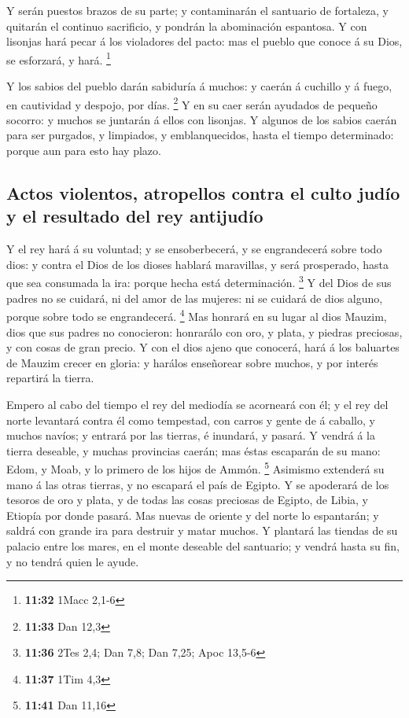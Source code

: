  Y serán puestos brazos de su parte; y contaminarán el
santuario de fortaleza, y quitarán el continuo sacrificio, y pondrán la
abominación espantosa.  Y con lisonjas hará pecar á los
violadores del pacto: mas el pueblo que conoce á su Dios, se esforzará,
y hará. \footnote{\textbf{11:32} 1Macc 2,1-6}

 Y los sabios del pueblo darán sabiduría á muchos: y
caerán á cuchillo y á fuego, en cautividad y despojo, por días.
\footnote{\textbf{11:33} Dan 12,3}  Y en su caer serán
ayudados de pequeño socorro: y muchos se juntarán á ellos con lisonjas.
 Y algunos de los sabios caerán para ser purgados, y
limpiados, y emblanquecidos, hasta el tiempo determinado: porque aun
para esto hay plazo.

\hypertarget{actos-violentos-atropellos-contra-el-culto-juduxedo-y-el-resultado-del-rey-antijuduxedo}{%
\subsection{Actos violentos, atropellos contra el culto judío y el
resultado del rey
antijudío}\label{actos-violentos-atropellos-contra-el-culto-juduxedo-y-el-resultado-del-rey-antijuduxedo}}

 Y el rey hará á su voluntad; y se ensoberbecerá, y se
engrandecerá sobre todo dios: y contra el Dios de los dioses hablará
maravillas, y será prosperado, hasta que sea consumada la ira: porque
hecha está determinación. \footnote{\textbf{11:36} 2Tes 2,4; Dan 7,8;
  Dan 7,25; Apoc 13,5-6}  Y del Dios de sus padres no se
cuidará, ni del amor de las mujeres: ni se cuidará de dios alguno,
porque sobre todo se engrandecerá. \footnote{\textbf{11:37} 1Tim 4,3}
 Mas honrará en su lugar al dios Mauzim, dios que sus
padres no conocieron: honrarálo con oro, y plata, y piedras preciosas, y
con cosas de gran precio.  Y con el dios ajeno que
conocerá, hará á los baluartes de Mauzim crecer en gloria: y harálos
enseñorear sobre muchos, y por interés repartirá la tierra.

 Empero al cabo del tiempo el rey del mediodía se
acorneará con él; y el rey del norte levantará contra él como tempestad,
con carros y gente de á caballo, y muchos navíos; y entrará por las
tierras, é inundará, y pasará.  Y vendrá á la tierra
deseable, y muchas provincias caerán; mas éstas escaparán de su mano:
Edom, y Moab, y lo primero de los hijos de Ammón. \footnote{\textbf{11:41}
  Dan 11,16}  Asimismo extenderá su mano á las otras
tierras, y no escapará el país de Egipto.  Y se apoderará
de los tesoros de oro y plata, y de todas las cosas preciosas de Egipto,
de Libia, y Etiopía por donde pasará.  Mas nuevas de
oriente y del norte lo espantarán; y saldrá con grande ira para destruir
y matar muchos.  Y plantará las tiendas de su palacio
entre los mares, en el monte deseable del santuario; y vendrá hasta su
fin, y no tendrá quien le ayude.


